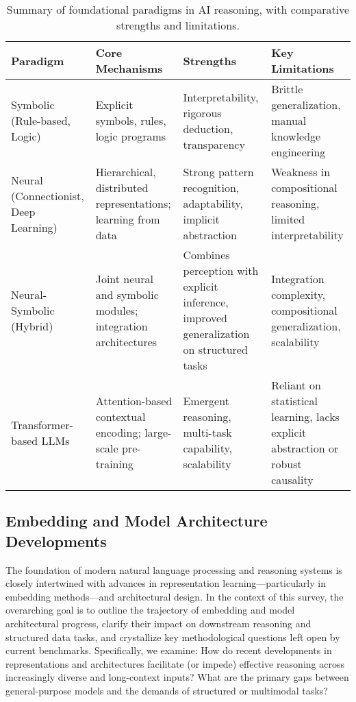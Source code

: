 \documentclass[sigconf]{acmart}
\begin{document}
\begin{table*}[htbp]
\centering
\caption{Summary of foundational paradigms in AI reasoning, with comparative strengths and limitations.}
\label{tab:paradigm_comparison}
\begin{adjustbox}{max width=\textwidth}
\begin{tabular}{@{}llll@{}}
\toprule
\textbf{Paradigm} & \textbf{Core Mechanisms} & \textbf{Strengths} & \textbf{Key Limitations} \\
\midrule
Symbolic (Rule-based, Logic) & Explicit symbols, rules, logic programs & Interpretability, rigorous deduction, transparency & Brittle generalization, manual knowledge engineering \\
Neural (Connectionist, Deep Learning) & Hierarchical, distributed representations; learning from data & Strong pattern recognition, adaptability, implicit abstraction & Weakness in compositional reasoning, limited interpretability \\
Neural-Symbolic (Hybrid) & Joint neural and symbolic modules; integration architectures & Combines perception with explicit inference, improved generalization on structured tasks & Integration complexity, compositional generalization, scalability \\
Transformer-based LLMs & Attention-based contextual encoding; large-scale pre-training & Emergent reasoning, multi-task capability, scalability & Reliant on statistical learning, lacks explicit abstraction or robust causality \\
\bottomrule
\end{tabular}
\end{adjustbox}
\end{table*}

\subsection{Embedding and Model Architecture Developments}

The foundation of modern natural language processing and reasoning systems is closely intertwined with advances in representation learning---particularly in embedding methods---and architectural design. In the context of this survey, the overarching goal is to outline the trajectory of embedding and model architectural progress, clarify their impact on downstream reasoning and structured data tasks, and crystallize key methodological questions left open by current benchmarks. Specifically, we examine: How do recent developments in representations and architectures facilitate (or impede) effective reasoning across increasingly diverse and long-context inputs? What are the primary gaps between general-purpose models and the demands of structured or multimodal tasks?
\end{document}
